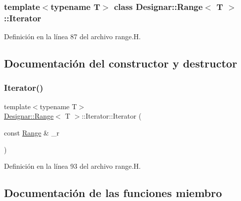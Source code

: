 \subsubsection*{template$<$typename T$>$\newline
class Designar\+::\+Range$<$ T $>$\+::\+Iterator}



Definición en la línea 87 del archivo range.\+H.



\subsection{Documentación del constructor y destructor}
\mbox{\label{class_designar_1_1_range_1_1_iterator_a25257fadc62207bcc4ca4b82b2b4c0cb}} 
\subsubsection{\texorpdfstring{Iterator()}{Iterator()}}
{\footnotesize\ttfamily template$<$typename T$>$ \\
\hyperlink{class_designar_1_1_range}{Designar\+::\+Range}$<$ T $>$\+::Iterator\+::\+Iterator (\begin{DoxyParamCaption}\item[{const \hyperlink{class_designar_1_1_range}{Range} \&}]{\+\_\+r }\end{DoxyParamCaption})\hspace{0.3cm}{\ttfamily [inline]}}



Definición en la línea 93 del archivo range.\+H.



\subsection{Documentación de las funciones miembro}
\mbox{\label{class_designar_1_1_range_1_1_iterator_a388c108434e6ff65af07ee3bc0d98204}} 
